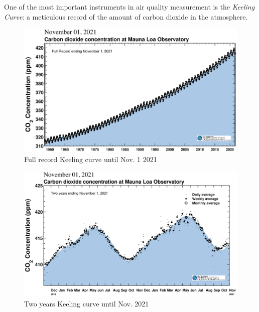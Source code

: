 		One of the most important instruments in air quality measurement is the \textit{Keeling Curve}: a meticulous record of the amount of carbon dioxide in the atmosphere.
	
		\noindent
		\begin{minipage}{0.49\textwidth}%
			\begin{figure}[H]
				\centering
				\includegraphics[width=\textwidth]{resources/img/chap2/keeling}
				\caption{Full record Keeling curve until Nov. 1 2021}
				\label{keeling_full}
			\end{figure}
		\end{minipage}%
		\hfill%
		\begin{minipage}{0.49\textwidth}\raggedright
			\begin{figure}[H]
				\centering				
				\includegraphics[width=\textwidth]{resources/img/chap2/mlo_two_years}
				\caption{Two years Keeling curve until Nov. 2021}
				\label{keeling_two}
			\end{figure}
		\end{minipage}
		\newline
		
